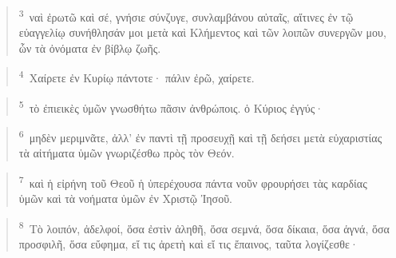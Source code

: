 \documentclass{article}
\newcommand{\currentverse}{1} %
\newcommand{\setcurrentverse}[1]{\renewcommand{\currentverse}{#1}}
\begin{document}
\begin{verse}

\setcurrentverse{3}

\setcounter{footnote}{0}

\textsuperscript{3}~ναὶ ἐρωτῶ καὶ σέ, γνήσιε σύνζυγε, συνλαμβάνου αὐταῖς, αἵτινες ἐν τῷ εὐαγγελίῳ συνήθλησάν μοι μετὰ καὶ Κλήμεντος καὶ τῶν λοιπῶν συνεργῶν μου, ὧν τὰ ὀνόματα ἐν βίβλῳ ζωῆς.

\end{verse}

\begin{verse}

\setcurrentverse{4}

\setcounter{footnote}{0}

\textsuperscript{4}~Χαίρετε ἐν Κυρίῳ πάντοτε· πάλιν ἐρῶ, χαίρετε.

\end{verse}

\begin{verse}

\setcurrentverse{5}

\setcounter{footnote}{0}

\textsuperscript{5}~τὸ ἐπιεικὲς ὑμῶν γνωσθήτω πᾶσιν ἀνθρώποις. ὁ Κύριος ἐγγύς·

\end{verse}

\begin{verse}

\setcurrentverse{6}

\setcounter{footnote}{0}

\textsuperscript{6}~μηδὲν μεριμνᾶτε, ἀλλ’ ἐν παντὶ τῇ προσευχῇ καὶ τῇ δεήσει μετὰ εὐχαριστίας τὰ αἰτήματα ὑμῶν γνωριζέσθω πρὸς τὸν Θεόν.

\end{verse}

\begin{verse}

\setcurrentverse{7}

\setcounter{footnote}{0}

\textsuperscript{7}~καὶ ἡ εἰρήνη τοῦ Θεοῦ ἡ ὑπερέχουσα πάντα νοῦν φρουρήσει τὰς καρδίας ὑμῶν καὶ τὰ νοήματα ὑμῶν ἐν Χριστῷ Ἰησοῦ.

\end{verse}

\begin{verse}

\setcurrentverse{8}

\setcounter{footnote}{0}

\textsuperscript{8}~Τὸ λοιπόν, ἀδελφοί, ὅσα ἐστὶν ἀληθῆ, ὅσα σεμνά, ὅσα δίκαια, ὅσα ἁγνά, ὅσα προσφιλῆ, ὅσα εὔφημα, εἴ τις ἀρετὴ καὶ εἴ τις ἔπαινος, ταῦτα λογίζεσθε·

\end{verse}
\end{document}
